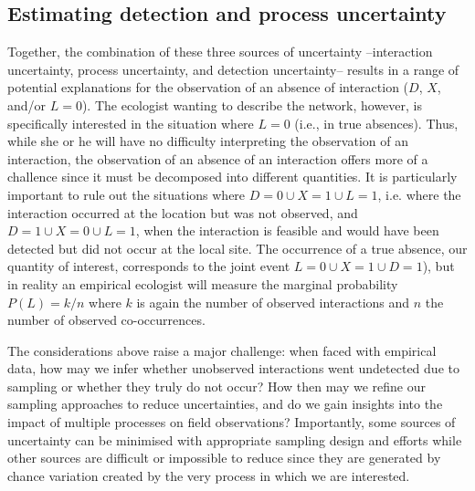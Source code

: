 \documentclass[12pt]{article}
\begin{document}
\begin{spacing}{2.0}
\section*{Estimating detection and process uncertainty}

    Together, the combination of these three sources of uncertainty --interaction uncertainty, process uncertainty, and detection uncertainty-- results in a range of potential explanations for the observation of an absence of interaction ($D$, $X$, and/or $L = 0$). The ecologist wanting to describe the network, however, is specifically interested in the situation where $L = 0$ (i.e., in true absences). Thus, while she or he will have no difficulty interpreting the observation of an interaction, the observation of an absence of an interaction offers more of a challence since it must be decomposed into different quantities. It is particularly important to rule out the situations where $D=0 \cup X = 1 \cup L=1$, i.e. where the interaction occurred at the location but was not observed, and $D=1 \cup X = 0 \cup L =1$, when the interaction is feasible and would have been detected but did not occur at the local site. The occurrence of a true absence, our quantity of interest, corresponds to the joint event $L=0 \cup X=1 \cup D=1$), but in reality an empirical ecologist will measure the marginal probability $P(L) = k/n$ where $k$ is again the number of observed interactions and $n$ the number of observed co-occurrences.


    The considerations above raise a major challenge: when faced with empirical data, how may we infer whether unobserved interactions went undetected due to sampling or whether they truly do not occur? How then may we refine our sampling approaches to reduce uncertainties, and do we gain insights into the impact of multiple processes on field observations? Importantly, some sources of uncertainty can be minimised with appropriate sampling design and efforts while other sources are difficult or impossible to reduce since they are generated by chance variation created by the very process in which we are interested.





\end{spacing}
\end{document}
